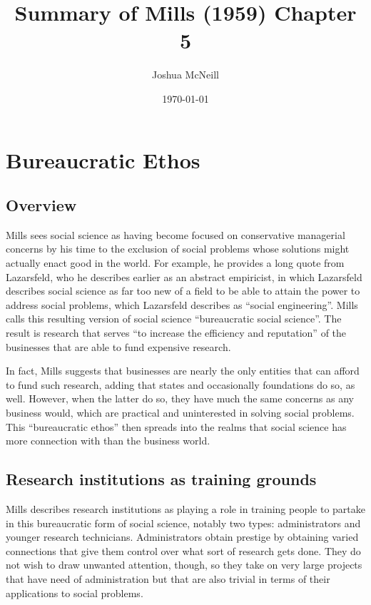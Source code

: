 \documentclass{article}
\title{Summary of Mills (1959) Chapter 5}
\author{Joshua McNeill}
\date{\today}
\begin{document}
  \maketitle
  \section{Bureaucratic Ethos}
    \subsection{Overview}
      Mills sees social science as having become focused on conservative managerial concerns by his time to the exclusion of social problems whose solutions might actually enact good in the world.
      For example, he provides a long quote from Lazarsfeld, who he describes earlier as an abstract empiricist, in which Lazarsfeld describes social science as far too new of a field to be able to attain the power to address social problems, which Lazarsfeld describes as ``social engineering''.
      Mills calls this resulting version of social science ``bureaucratic social science''.
      The result is research that serves ``to increase the efficiency and reputation'' of the businesses that are able to fund expensive research.

      In fact, Mills suggests that businesses are nearly the only entities that can afford to fund such research, adding that states and occasionally foundations do so, as well.
      However, when the latter do so, they have much the same concerns as any business would, which are practical and uninterested in solving social problems.
      This ``bureaucratic ethos'' then spreads into the realms that social science has more connection with than the business world.

    \subsection{Research institutions as training grounds}
      Mills describes research institutions as playing a role in training people to partake in this bureaucratic form of social science, notably two types: administrators and younger research technicians.
      Administrators obtain prestige by obtaining varied connections that give them control over what sort of research gets done.
      They do not wish to draw unwanted attention, though, so they take on very large projects that have need of administration but that are also trivial in terms of their applications to social problems.
\end{document}

